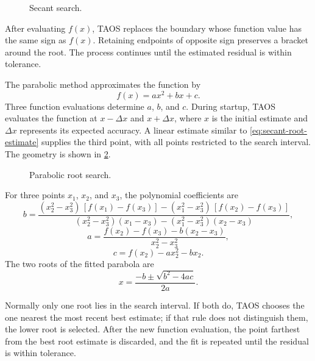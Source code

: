\begin{figure}[htbp]
  \centering
  
  \caption{Secant search.}
  \label{fig:secant-search}
\end{figure}

After evaluating $f(x)$, TAOS replaces the boundary whose function value has the
same sign as $f(x)$. Retaining endpoints of opposite sign preserves a bracket around
the root. The process continues until the estimated residual is within tolerance.


The parabolic method approximates the function by
\begin{equation}
  f(x)=a x^2+b x+c.
  \label{eq:parabolic-search-polynomial}
\end{equation}
Three function evaluations determine $a$, $b$, and $c$. During startup, TAOS
evaluates the function at $x-\Delta x$ and $x+\Delta x$, where $x$ is the initial
estimate and $\Delta x$ represents its expected accuracy. A linear estimate similar
to \cref{eq:secant-root-estimate} supplies the third point, with all points restricted
to the search interval. The geometry is shown in
\cref{fig:parabolic-root-search}.

\begin{figure}[htbp]
  \centering
  
  \caption{Parabolic root search.}
  \label{fig:parabolic-root-search}
\end{figure}

For three points $x_1$, $x_2$, and $x_3$, the polynomial coefficients are
\begin{equation}
  b=
  \frac{
    (x_2^2-x_3^2)\,[f(x_1)-f(x_3)]
    -(x_1^2-x_3^2)\,[f(x_2)-f(x_3)]
  }{
    (x_2^2-x_3^2)(x_1-x_3)
    -(x_1^2-x_3^2)(x_2-x_3)
  },
  \label{eq:parabolic-search-b}
\end{equation}
\begin{equation}
  a=
  \frac{f(x_2)-f(x_3)-b(x_2-x_3)}{x_2^2-x_3^2},
  \label{eq:parabolic-search-a}
\end{equation}
\begin{equation}
  c=f(x_2)-a x_2^2-b x_2.
  \label{eq:parabolic-search-c}
\end{equation}
The two roots of the fitted parabola are
\begin{equation}
  x=\frac{-b\pm\sqrt{b^2-4ac}}{2a}.
  \label{eq:parabolic-search-roots}
\end{equation}

Normally only one root lies in the search interval. If both do, TAOS chooses the one
nearest the most recent best estimate; if that rule does not distinguish them, the
lower root is selected. After the new function evaluation, the point farthest from the
best root estimate is discarded, and the fit is repeated until the residual is within
tolerance.

